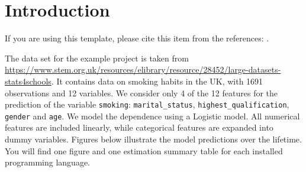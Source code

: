 \section{Introduction}

If you are using this template, please cite this item from the references:
\citet{GaudeckerEconProjectTemplates}.

The data set for the example project is taken from
\url{https://www.stem.org.uk/resources/elibrary/resource/28452/large-datasets-stats4schools}.
It contains data on smoking habits in the UK, with 1691 observations and 12 variables.
We consider only 4 of the 12 features for the prediction of the variable
\texttt{smoking}: \texttt{marital\_status}, \texttt{highest\_qualification},
\texttt{gender} and \texttt{age}. We model the dependence using a Logistic model. All
numerical features are included linearly, while categorical features are expanded into
dummy variables. Figures below illustrate the model predictions over the lifetime. You
will find one figure and one estimation summary table for each installed programming
language.

